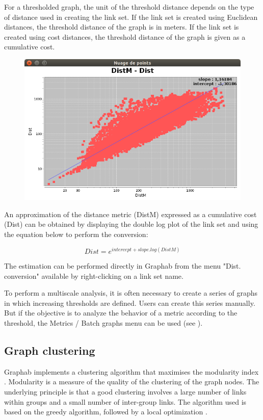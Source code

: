 \documentclass{article}
\begin{document}
For a thresholded graph, the unit of the threshold distance depends on the type of distance used in creating the link set. If the link set is created using Euclidean distances, the threshold distance of the graph is in meters. If the link set is created using cost distances, the threshold distance of the graph is given as a cumulative cost.

\begin{figure}[H]
	\includegraphics[scale=0.5]{img/manual-fr_img7.png}
\end{figure}

An approximation of the distance metric (DistM) expressed as a cumulative cost (Dist) can be obtained by displaying the double log plot of the link set and using the equation below to perform the conversion:

$$Dist = e^{intercept + slope . log(DistM)}$$

The estimation can be performed directly in Graphab from the menu "Dist. conversion" available by right-clicking on a link set name.

To perform a multiscale analysis, it is often necessary to create a series of graphs in which increasing thresholds are defined. Users can create this series manually. But if the objective is to analyze the behavior of a metric according to the threshold, the Metrics / Batch graphs menu can be used (see ).


\subsection{Graph clustering}

Graphab implements a clustering algorithm that maximises the modularity index \cite{Newman2006}. Modularity is a measure of the quality of the clustering of the graph nodes. The underlying principle is that a good clustering involves a large number of links within groups and a small number of inter-group links. The algorithm used is based on the greedy algorithm, followed by a local optimization \cite{Brandes2008}.
\end{document}
